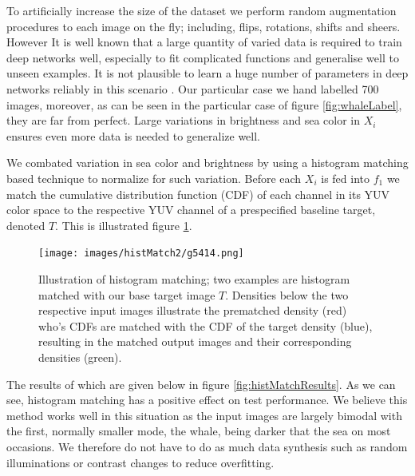\documentclass{IET}%
\begin{document}
To artificially increase the size of the dataset we perform random augmentation procedures to each image on the fly; including, flips, rotations, shifts and sheers. However It is well known that a large quantity of varied data is required to train deep networks well, especially to fit complicated functions and generalise well to unseen examples. It is not plausible to learn a huge number of parameters in deep networks reliably in this scenario \cite{zhu2011semi}. Our particular case we hand labelled 700 images, moreover, as can be seen in the particular case of figure \ref{fig:whaleLabel}, they are far from perfect. Large variations in brightness and sea color in $X_i$ ensures even more data is needed to generalize well. 

We combated variation in sea color and brightness by using a histogram matching \cite{gonzalez2002digital} based technique to normalize for such variation. Before each $X_i$ is fed into $f_1$ we match the cumulative distribution function (CDF) of each channel in its YUV color space to the respective YUV channel of a prespecified baseline target, denoted $T$. This is illustrated figure \ref{fig:histMatch}.

\begin{figure}[h]
\centering
\texttt{[image: images/histMatch2/g5414.png]}
\caption{Illustration of histogram matching; two examples are histogram matched with our base target image $T$. Densities below the two respective input images illustrate the prematched density (red) who's CDFs are matched with the CDF of the target density (blue), resulting in the matched output images and their corresponding densities (green).}
\label{fig:histMatch}
\end{figure}

The results of which are given below in figure \ref{fig:histMatchResults}. As we can see, histogram matching has a positive effect on test performance. We believe this method works well in this situation as the input images are largely bimodal with the first, normally smaller mode, the whale, being darker that the sea on most occasions. We therefore do not have to do as much data synthesis such as random illuminations or contrast changes to reduce overfitting.
\end{document}
